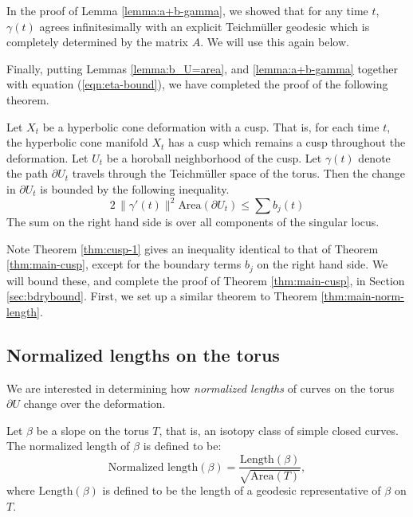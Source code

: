 \begin{remark}
In the proof of Lemma \ref{lemma:a+b-gamma}, we showed that for any
time $t$, $\gamma(t)$ agrees infinitesimally with an explicit
Teichm\"uller geodesic which is completely determined by the matrix
$A$.  We will use this again below.
\end{remark}

Finally, putting Lemmas \ref{lemma:b_U=area}, and
\ref{lemma:a+b-gamma} together with equation (\ref{eqn:eta-bound}), we
have completed the proof of the following theorem.

\begin{theorem}
	Let $X_t$ be a hyperbolic cone deformation with a cusp.  That is,
  for each time $t$, the hyperbolic cone manifold $X_t$ has a cusp
  which remains a cusp throughout the deformation.  Let $U_t$ be a
  horoball neighborhood of the cusp.  Let $\gamma(t)$ denote the path
  $\partial U_t$ travels through the Teichm{\"u}ller space of the
  torus.  Then the change in $\partial U_t$ is bounded by the following
  inequality.
$$2\,\|\gamma'(t)\|^2 \mbox{Area}(\partial U_t) \leq \sum b_j(t)$$
The sum on the right hand side is over all components of the singular
locus.  
\label{thm:cusp-1}
\end{theorem}

Note Theorem \ref{thm:cusp-1} gives an inequality identical to that of
Theorem \ref{thm:main-cusp}, except for the boundary terms $b_j$ on
the right hand side.  We will bound these, and complete the proof of
Theorem \ref{thm:main-cusp}, in Section \ref{sec:bdrybound}.  First,
we set up a similar theorem to Theorem \ref{thm:main-norm-length}.


\subsection{Normalized lengths on the torus}
	\label{sec:normlength}

We are interested in determining how \emph{normalized lengths} of
curves on the torus $\partial U$ change over the deformation. 

\begin{define}
  Let $\beta$ be a slope on the torus $T$, that is, an isotopy class
  of simple closed curves.  The normalized length of $\beta$ is
  defined to be:
  $$\mbox{Normalized length}(\beta) =
  \frac{\mbox{Length}(\beta)}{\sqrt{\mbox{Area}(T)}},$$
	where $\mbox{Length}(\beta)$ is defined to be the length of a
  geodesic representative of $\beta$ on $T$.
\end{define}

